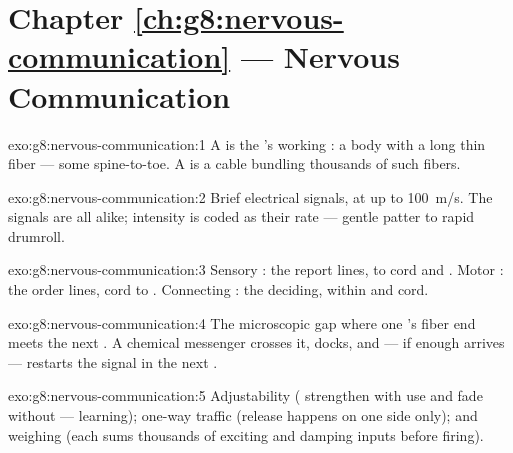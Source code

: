 \section*{Chapter \ref{ch:g8:nervous-communication} --- Nervous Communication}

\begin{solution}{exo:g8:nervous-communication:1}
A  is the 's working : a  body
with a long thin fiber --- some spine-to-toe. A  is a
cable bundling thousands of such fibers.
\end{solution}

\begin{solution}{exo:g8:nervous-communication:2}
Brief electrical signals, at up to \qty{100}{m/s}. The
signals are all alike; intensity is coded as their rate ---
gentle patter to rapid drumroll.
\end{solution}

\begin{solution}{exo:g8:nervous-communication:3}
Sensory : the report lines,  to cord and
. Motor : the order lines, cord to .
Connecting : the deciding, within  and cord.
\end{solution}

\begin{solution}{exo:g8:nervous-communication:4}
The microscopic gap where one 's fiber end meets the
next . A chemical messenger crosses it, docks, and ---
if enough arrives --- restarts the signal in the next
.
\end{solution}

\begin{solution}{exo:g8:nervous-communication:5}
Adjustability ( strengthen with use and fade
without --- learning); one-way traffic (release happens on
one side only); and weighing (each  sums thousands
of exciting and damping inputs before firing).
\end{solution}

